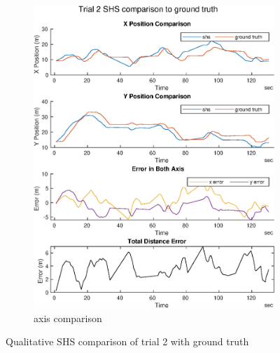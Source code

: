 \begin{figure}[H]
\begin{subfigure}[t]{.45\textwidth}
		\includegraphics[width=\linewidth]{images/20201029_1042_trial2_shs_2}
		\caption{axis comparison}
		\label{fig:trial2_comparison}
	\end{subfigure}
\setlength{\belowcaptionskip}{-20pt}
	\caption{Qualitative SHS comparison of trial 2 with ground truth}
	\label{fig:trial2_shs_gt_comparison}
\end{figure}


